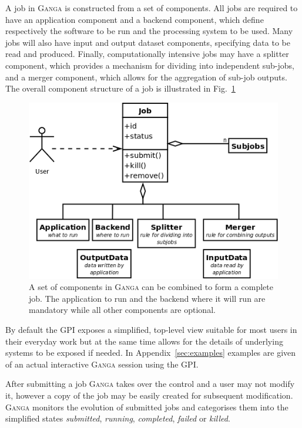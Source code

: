 \documentclass{elsart}
\def\ganga {\textsc{Ganga}\xspace}
\def\GPI{GPI\xspace}
\newcommand{\val}[1]{\emph{#1}}
\begin{document}
A job in \ganga is constructed from a set of components. All jobs are
required to have an application component and a backend component, which
define respectively the software to be run and the processing system to be
used.  Many jobs will also have input and output dataset components,
specifying data to be read and produced.  Finally, computationally intensive
jobs may have a splitter component, which provides a mechanism for dividing
into independent sub-jobs, and a merger component, which allows for the
aggregation of sub-job outputs. The overall component structure of a job is
illustrated in Fig.~\ref{fig:JobComponents}
\begin{figure}
  \centering
  \includegraphics[width=14cm]{job-uml.png}
  \caption{A set of components in \ganga can be combined to form a complete
    job. The application to run and the backend where it will run are
    mandatory while all other components are optional.}
  \label{fig:JobComponents}
\end{figure}

By default the \GPI exposes a simplified, top-level view suitable for most
users in their everyday work but at the same time allows for the details of
underlying systems to be exposed if needed. In Appendix~\ref{sec:examples}
examples are given of an actual interactive \ganga session using the \GPI.

After submitting a job \ganga takes over the control and a user may not modify
it, however a copy of the job may be easily created for subsequent
modification. \ganga monitors the evolution of submitted jobs and categorises
them into the simplified states \val{submitted}, \val{running},
\val{completed}, \val{failed} or \val{killed}.
\end{document}
